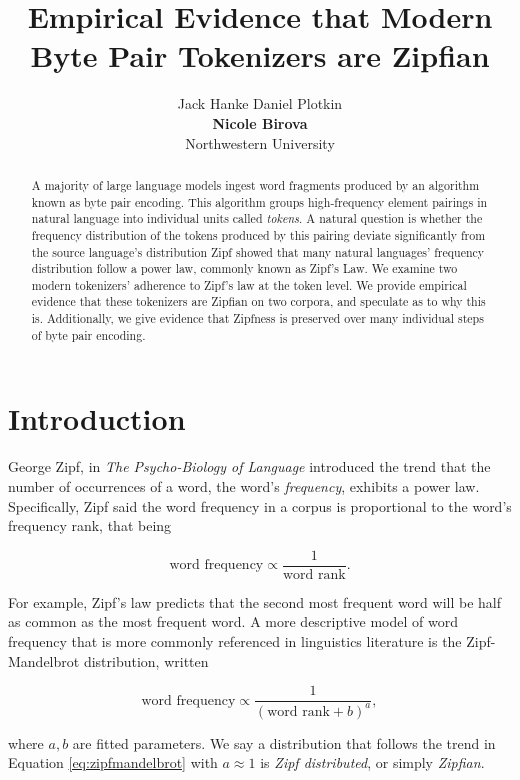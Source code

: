 \documentclass[11pt]{article}
\title{Empirical Evidence that Modern Byte Pair Tokenizers are Zipfian}
\author{Jack Hanke \qquad Daniel Plotkin \\ 
        {\bf Nicole Birova} \qquad {\bf David Demeter} \\
        Northwestern University }
\begin{document}
\maketitle
\begin{abstract}
A majority of large language models ingest word fragments produced by an algorithm known as byte pair encoding. This algorithm groups high-frequency element pairings in natural language into individual units called \textit{tokens}. A natural question is whether the frequency distribution of the tokens produced by this pairing deviate significantly from the source language's distribution Zipf showed that many natural languages' frequency distribution follow a power law, commonly known as Zipf's Law. We examine two modern tokenizers' adherence to Zipf's law at the token level. We provide empirical evidence that these tokenizers are Zipfian on two corpora, and speculate as to why this is. Additionally, we give evidence that Zipfness is preserved over many individual steps of byte pair encoding.
\end{abstract}

\section{Introduction}
\label{section:intro}

George Zipf, in \textit{The Psycho-Biology of Language} \cite{Zip35} introduced the trend that the number of occurrences of a word, the word's \textit{frequency}, exhibits a power law. Specifically, Zipf said the word frequency in a corpus is proportional to the word's frequency rank, that being

\begin{equation}
    \mbox{word frequency} \propto \frac{1}{\mbox{word rank}}.
\end{equation}

For example, Zipf's law predicts that the second most frequent word will be half as common as the most frequent word. A more descriptive model of word frequency that is more commonly referenced in linguistics literature is the Zipf-Mandelbrot distribution, written

\begin{equation}
    \mbox{word frequency} \propto \frac{1}{(\mbox{word rank} + b)^a}, 
    \label{eq:zipfmandelbrot}
\end{equation}

where $a,b$ are fitted parameters. We say a distribution that follows the trend in Equation \ref{eq:zipfmandelbrot} with $a \approx 1$ is \textit{Zipf distributed}, or simply \textit{Zipfian}.
\end{document}
